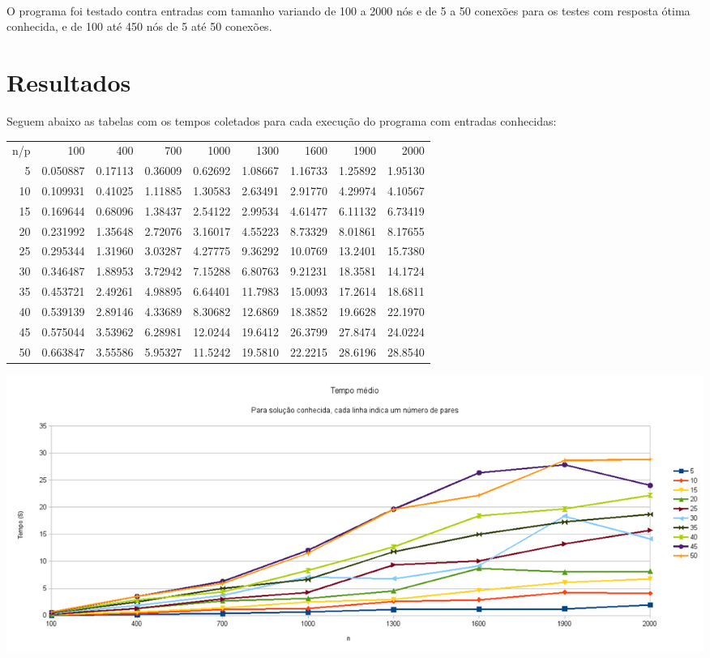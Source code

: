 \documentclass{article}
\begin{document}
\paragraph{} O programa foi testado contra entradas com tamanho
variando de 100 a 2000 nós e de 5 a 50 conexões para os testes com
resposta ótima conhecida, e de 100 até 450 nós de 5 até 50 conexões.

\section*{Resultados} Seguem abaixo as tabelas com os tempos coletados
para cada execução do programa com entradas conhecidas:
\begin{center}
\begin{tabular}{rrrrrrrrr}
n/p & 100 & 400 & 700 & 1000 & 1300 & 1600 & 1900 & 2000\\
5 & 0.050887 & 0.17113 & 0.36009 & 0.62692 & 1.08667 & 1.16733 & 1.25892 & 1.95130\\
10 & 0.109931 & 0.41025 & 1.11885 & 1.30583 & 2.63491 & 2.91770 & 4.29974 & 4.10567\\
15 & 0.169644 & 0.68096 & 1.38437 & 2.54122 & 2.99534 & 4.61477 & 6.11132 & 6.73419\\
20 & 0.231992 & 1.35648 & 2.72076 & 3.16017 & 4.55223 & 8.73329 & 8.01861 & 8.17655\\
25 & 0.295344 & 1.31960 & 3.03287 & 4.27775 & 9.36292 & 10.0769 & 13.2401 & 15.7380\\
30 & 0.346487 & 1.88953 & 3.72942 & 7.15288 & 6.80763 & 9.21231 & 18.3581 & 14.1724\\
35 & 0.453721 & 2.49261 & 4.98895 & 6.64401 & 11.7983 & 15.0093 & 17.2614 & 18.6811\\
40 & 0.539139 & 2.89146 & 4.33689 & 8.30682 & 12.6869 & 18.3852 & 19.6628 & 22.1970\\
45 & 0.575044 & 3.53962 & 6.28981 & 12.0244 & 19.6412 & 26.3799 & 27.8474 & 24.0224\\
50 & 0.663847 & 3.55586 & 5.95327 & 11.5242 & 19.5810 & 22.2215 & 28.6196 & 28.8540\\
\end{tabular}
\end{center}
\includegraphics[scale=0.4]{graphic_know}
\end{document}
